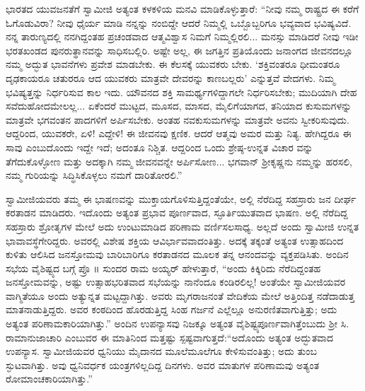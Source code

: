 ಭಾರತದ ಯುವಜನತೆಗೆ ಸ್ವಾಮೀಜಿ ಅತ್ಯಂತ ಕಳಕಳಿಯ ಮನವಿ ಮಾಡಿಕೊಳ್ಳುತ್ತಾರೆ: “ನೀವು ನಮ್ಮ ರಾಷ್ಟ್ರದ ಈ ಕರೆಗೆ ಓಗೊಡುವಿರಾ? ನೀವು ಧೈರ್ಯ ಮಾಡಿ ನನ್ನನ್ನು ನಂಬಿದ್ದೇ ಆದರೆ ನಿಮ್ಮಲ್ಲಿ ಒಬ್ಬೊಬ್ಬರಿಗೂ ಭವ್ಯವಾದ ಭವಿಷ್ಯವಿದೆ. ನನ್ನ ತಾರುಣ್ಯದಲ್ಲಿ ನನಗಿದ್ದಂತಹ ಪ್ರಚಂಡವಾದ ಆತ್ಮವಿಶ್ವಾಸ ನಿಮಗೆ ನಿಮ್ಮಲ್ಲಿರಲಿ... ಮನಸ್ಸು ಮಾಡಿದರೆ ನೀವು ಇಡೀ ಭರತಖಂಡದ ಪುನರುತ್ಥಾನವನ್ನು ಸಾಧಿಸಬಲ್ಲಿರಿ. ಅಷ್ಟೇ ಅಲ್ಲ, ಈ ಜಗತ್ತಿನ ಪ್ರತಿಯೊಂದು ಜನಾಂಗದ ಜೀವನದಲ್ಲೂ ನಮ್ಮ ಅದ್ಭುತ ಭಾವನೆಗಳು ಪ್ರವೇಶ ಮಾಡಬೇಕು. ಈ ಕೆಲಸಕ್ಕೆ ಯುವಕರು ಬೇಕು. ‘ಶಕ್ತಿವಂತರೂ ಧೀಮಂತರೂ ದೃಢಕಾಯರೂ ಚತುರರೂ ಆದ ಯುವಕರು ಮಾತ್ರವೇ ದೇವರನ್ನು ಕಾಣಬಲ್ಲರು’ ಎನ್ನುತ್ತವೆ ವೇದಗಳು. ನಿಮ್ಮ ಭವಿಷ್ಯತ್ತನ್ನು ನಿರ್ಧರಿಸುವ ಕಾಲ ಇದು. ಯೌವನದ ಶಕ್ತಿ ಸಾಮರ್ಥ್ಯಗಳಿದ್ದಾಗಲೇ ನಿರ್ಧರಿಸಬೇಕು; ಮುದಿಯಾಗಿ ದೇಹ ಸವೆದುಹೋದಮೇಲಲ್ಲ... ಏಕೆಂದರೆ ಮುಟ್ಟದ, ಮೂಸದ, ಮಾಸದ, ಮೈಲಿಗೆಯಾಗದ, ತನಿಯಾದ ಕುಸುಮಗಳನ್ನು ಮಾತ್ರವೇ ಭಗವಂತನ ಪಾದಗಳಿಗೆ ಅರ್ಪಿಸಬೇಕು. ಅಂತಹ ನವಕುಸುಮಗಳನ್ನು ಮಾತ್ರವೇ ಅವನು ಸ್ವೀಕರಿಸುವುದು. ಆದ್ದರಿಂದ, ಯುವಕರೇ, ಏಳಿ! ಎದ್ದೇಳಿ! ಈ ಜೀವನವು ಕ್ಷಣಿಕ. ಆದರೆ ಆತ್ಮವು ಅಮರ ಮತ್ತು ನಿತ್ಯ. ಹೇಗಿದ್ದರೂ ಈ ಸಾವು ಎಂಬುದೊಂದು ಇದ್ದೇ ಇದೆ; ಅದಂತೂ ನಿಶ್ಚಿತ. ಆದ್ದರಿಂದ ಒಂದು ಶ್ರೇಷ್ಠ-ಉನ್ನತ ವಿಚಾರ ವನ್ನು ತೆಗೆದುಕೊಳ್ಳೋಣ ಮತ್ತು ಅದಕ್ಕಾಗಿ ನಮ್ಮ ಜೀವನವನ್ನೇ ಅರ್ಪಿಸೋಣ... ಭಗವಾನ್ ಶ್ರೀಕೃಷ್ಣನು ನಮ್ಮನ್ನು ಹರಸಲಿ, ನಮ್ಮ ಗುರಿಯನ್ನು ಸಿದ್ಧಿಸಿಕೊಳ್ಳಲು ನಮಗೆ ದಾರಿತೋರಲಿ.”

ಸ್ವಾಮೀಜಿಯವರು ತಮ್ಮ ಈ ಭಾಷಣವನ್ನು ಮುಕ್ತಾಯಗೊಳಿಸುತ್ತಿದ್ದಂತೆಯೇ, ಅಲ್ಲಿ ನೆರೆದಿದ್ದ ಸಹಸ್ರಾರು ಜನ ದೀರ್ಘ ಕರತಾಡನ ಮಾಡಿದರು. ಇದೊಂದು ಅತ್ಯಂತ ಪ್ರಭಾವ ಪೂರ್ಣವಾದ, ಸ್ಫೂರ್ತಿಯುತವಾದ ಭಾಷಣ. ಅಲ್ಲಿ ನೆರೆದಿದ್ದ ಸಹಸ್ರಾರು ಶ್ರೋತೃಗಳ ಮೇಲೆ ಅದು ಉಂಟುಮಾಡಿದ ಪರಿಣಾಮ ವರ್ಣಿಸಲಸಾಧ್ಯ. ಅಲ್ಲದೆ ಅಂದು ಸ್ವಾಮೀಜಿ ಉನ್ನತ ಭಾವಾವಸ್ಥೆಗೇರಿದ್ದರು. ಅವರಲ್ಲಿ ವಿಶೇಷ ಶಕ್ತಿಯ ಆವಿರ್ಭಾವವಾದಂತಿತ್ತು. ಅದಕ್ಕೆ ತಕ್ಕಂತೆ ಅತ್ಯಂತ ಉತ್ಸಾಹದಿಂದ ಕುಳಿತು ಆಲಿಸಿದ ಜನಸ್ತೋಮವು ಬಾರಿಬಾರಿಗೂ ಕರತಾಡನದ ಮೂಲಕ ತನ್ನ ಆನಂದವನ್ನು ವ್ಯಕ್ತಪಡಿಸಿತು. ಅಂದಿನ ಸಭೆಯ ವೈಶಿಷ್ಟ್ಯದ ಬಗ್ಗೆ ಪ್ರೊ ॥ ಸುಂದರ ರಾಮ ಅಯ್ಯರ್ ಹೇಳುತ್ತಾರೆ, “ಅಂದು ಕಿಕ್ಕಿರಿದು ನೆರೆದಿದ್ದಂತಹ ಜನಸ್ತೋಮವನ್ನು, ಅಷ್ಟು ಉತ್ಸಾಹಭರಿತವಾದ ಸಭೆಯನ್ನು ನಾನೆಂದೂ ಕಂಡಿರಲಿಲ್ಲ! ಅಂತೆಯೇ ಸ್ವಾಮೀಜಿಯವರ ವಾಗ್ಮಿತೆಯೂ ಅಂದು ಅತ್ಯುನ್ನತ ಮಟ್ಟದ್ದಾಗಿತ್ತು. ಅವರು ಮೃಗರಾಜನಂತೆ ವೇದಿಕೆಯ ಮೇಲೆ ಅತ್ತಿಂದಿತ್ತ ನಡೆದಾಡುತ್ತ ಮಾತನಾಡುತ್ತಿದ್ದರು. ಅವರ ಕಂಠದಿಂದ ಹೊರಡುತ್ತಿದ್ದ ಸಿಂಹ ಗರ್ಜನೆ ಎಲ್ಲೆಲ್ಲೂ ಅನುರಣಿತವಾಗುತ್ತಿತ್ತು; ಅದು ಅತ್ಯಂತ ಪರಿಣಾಮಕಾರಿಯಾಗಿತ್ತು.” ಅಂದಿನ ಉಪನ್ಯಾಸವು ನಿಜಕ್ಕೂ ಅತ್ಯಂತ ವೈಶಿಷ್ಟ್ಯಪೂರ್ಣವಾಗಿತ್ತೆಂಬುದು ಶ್ರೀ ಸಿ. ರಾಮಾನುಜಾಚಾರಿ ಎಂಬುವರ ಈ ಮಾತಿನಿಂದ ಮತ್ತಷ್ಟು ಸ್ಪಷ್ಟವಾಗುತ್ತದೆ:“ಅದೊಂದು ಅತ್ಯಂತ ಅದ್ಭುತವಾದ ಉಪನ್ಯಾಸ. ಸ್ವಾಮೀಜಿಯವರ ಧ್ವನಿಯು ಮೈದಾನದ ಮೂಲೆಮೂಲೆಗೂ ಕೇಳಿಸುವಂತಿತ್ತು; ಅದು ತುಂಬ ಸ್ಫುಟವಾಗಿತ್ತು. ಅವು ಧ್ವನಿವರ್ಧಕ ಯಂತ್ರಗಳಿಲ್ಲದಿದ್ದ ದಿನಗಳು. ಅವರ ಮಾತುಗಳ ಪರಿಣಾಮವು ಅತ್ಯಂತ ರೋಮಾಂಚಕಾರಿಯಾಗಿತ್ತು.”

